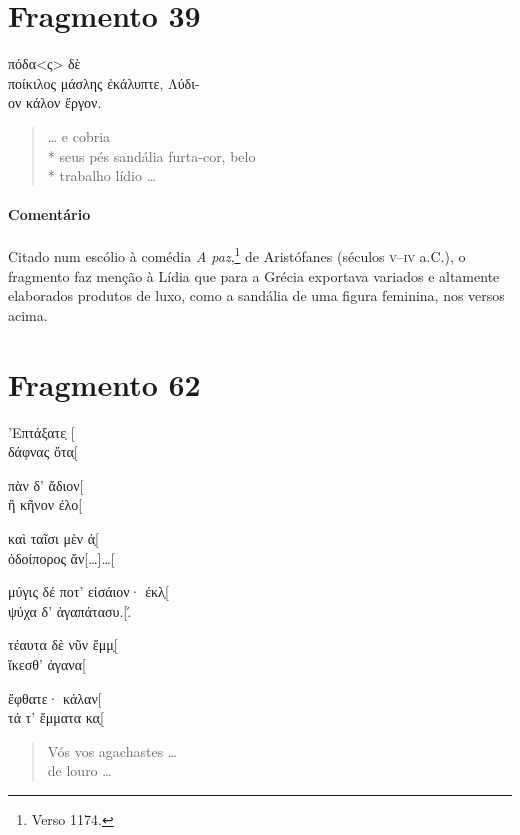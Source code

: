 {\section{Fragmento 39}

\begin{gkverse}
πόδα<ς> δὲ\\
ποίκιλος μάσλης ἐκάλυπτε, Λύδι-\\
ον κάλον ἔργον.
\end{gkverse}

\begin{verse}
\ldots{} e cobria\\*
seus pés sandália furta-cor, belo\\*
trabalho lídio \ldots{}
\end{verse}

\medskip

{\paragraph{Comentário} Citado num escólio à comédia \textit{A paz},\footnote{Verso 1174.} 
de Aristófanes (séculos \textsc{v}--\textsc{iv} a.C.),
o fragmento faz menção à Lídia que para a Grécia exportava variados e altamente
elaborados produtos de luxo, como a sandália de uma figura feminina, nos versos acima.}


\pagebreak
\section{Fragmento 62}

\begin{gkverse}
’Επτάξατε̣ [\\
δάφνας ὄτα̣[

πὰν δ’ ἄδιον[\\
ἢ κῆνον ἐλο[

καὶ ταῖσι μὲν ἀ̣[\\
ὀδοίπορος ἄν[\ldots{}]\ldots{}[

μύγις δέ ποτ’ εἰσάιον· ἐκλ̣[\\
ψύχα δ’ ἀγαπάτασυ.[.́

τέαυτα δὲ νῦν ἔμμ̣[\\
ἴκεσθ’ ἀγανα[

ἔφθατε· κάλαν[\\
τά τ’ ἔμματα κα̣[
\end{gkverse}

\begin{verse}
Vós vos agachastes \ldots{}\\
de louro \ldots{}


\end{verse}}

